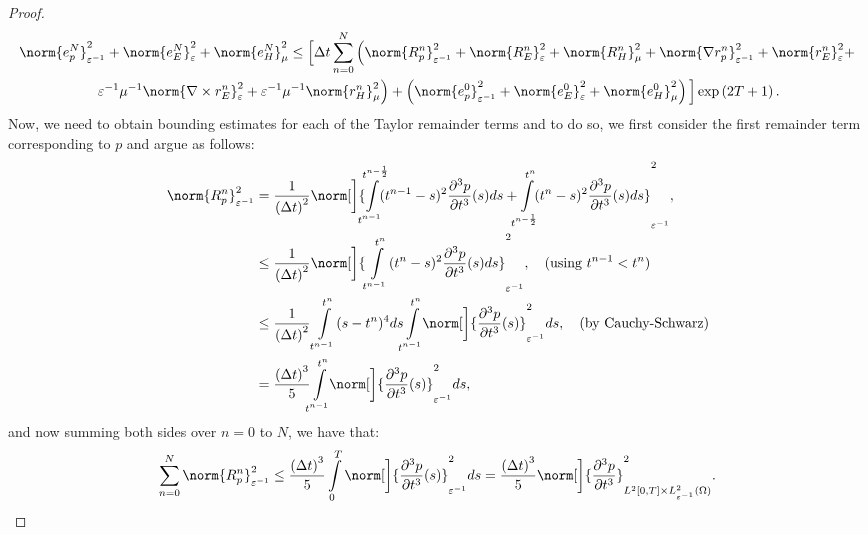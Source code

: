 \documentclass{amsart}
\theoremstyle{thmstyleone}%
\theoremstyle{thmstyletwo}%
\theoremstyle{thmstylethree}%
\begin{document}
\begin{proof}
\begin{multline}
  \norm{e_p^N}^2_{\varepsilon^{-1}} + \norm{e_E^N}^2_{\varepsilon} + \norm{e_H^N}^2_{\mu} \le \Big[ \Delta t \sum\limits_{n = 0}^{N} \left( \norm{R_p^n}^2_{\varepsilon^{-1}} + \norm{R_E^n}^2_{\varepsilon} + \norm{R_H^n}^2_{\mu} + \norm{\nabla r_p^n} ^2_{\varepsilon^{-1}} + \norm{r_E^n}^2_{\varepsilon} + \right. \\ \left. \varepsilon^{-1} \mu^{-1} \norm{\nabla \times r_E^n}^2_{\varepsilon} +  \varepsilon^{-1} \mu^{-1} \norm{r_H^n}^2_{\mu} \right) + 
  \left( \norm{e_p^0}^2_{\varepsilon^{-1}} + \norm{e_E^0}^2_{\varepsilon} + \norm{e_H^0}^2_{\mu} \right) \Big] \exp\left( 2 T + 1 \right). \label{eqn:error_Gronwall_cn}
\end{multline}
Now, we need to obtain bounding estimates for each of the Taylor remainder terms and to do so, we first consider the first remainder term corresponding to $p$ and argue as follows:
\begin{align*}
\norm{R^n_p}^2_{\varepsilon^{-1}} &= \dfrac{1}{\left( \Delta t \right)^2} \norm[\bigg]{\int\limits_{\mathclap{t^{n - 1}}}^{\mathclap{t^{n - \frac{1}{2}}}} (t^{n - 1} - s)^2 \dfrac{\partial^3 p}{\partial t^3}(s) ds + \int\limits_{\mathclap{t^{n - \frac{1}{2}}}}^{t^n} (t^n - s)^2 \dfrac{\partial^3 p}{\partial t^3}(s) ds}^2_{\varepsilon^{-1}}, \\
&\le \dfrac{1}{\left( \Delta t \right)^2} \norm[\bigg]{\int\limits_{t^{n - 1}}^{t^n} (t^n - s)^2 \dfrac{\partial^3 p}{\partial t^3}(s) ds}^2_{\varepsilon^{-1}}, \quad \text{(using $t^{n - 1} < t^n$)} \\
&\le \dfrac{1}{\left(\Delta t\right)^2} \int\limits_{t^{n - 1}}^{t^n} (s - t^n)^4 ds \int\limits_{\mathclap{t^{n - 1}}}^{t^n} \norm[\bigg]{\dfrac{\partial^3 p}{\partial t^3}(s)}^2_{\varepsilon^{-1}} ds, \quad \text{(by Cauchy-Schwarz)} \\
&= \dfrac{\left( \Delta t \right)^3}{5} \int\limits_{\mathclap{t^{n - 1}}}^{t^n} \norm[\bigg]{\dfrac{\partial^3 p}{\partial t^3}(s)}^2_{\varepsilon^{-1}} ds,
\end{align*}
and now summing both sides over $n = 0$ to $N$, we have that:
\begin{equation}
  \sum\limits_{n = 0}^N \norm{R^n_p}^2_{\varepsilon^{-1}} \le \dfrac{\left( \Delta t \right)^3}{5} \int\limits_0^T \norm[\bigg]{\dfrac{\partial^3 p}{\partial t^3}(s)}^2_{\varepsilon^{-1}} ds = \dfrac{\left( \Delta t \right)^3}{5} \norm[\bigg]{\dfrac{\partial^3 p}{\partial t^3}}^2_{L^2[0, T] \times L^2_{\varepsilon^{-1}}(\Omega)}. \label{eqn:Remainder_norm_p_cn}

\end{equation}
\end{proof}
\end{document}
